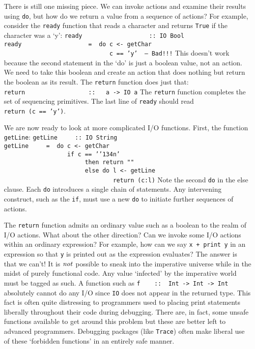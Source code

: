 There is still one missing piece.  We can invoke actions and examine
their results using \mbox{\tt do}, but how do we return a value from a sequence
of actions?  For example, consider the \mbox{\tt ready} function that reads a
character and returns \mbox{\tt True} if the character was a `y':
\bprog
\mbox{\tt ready\ \ \ \ \ \ \ \ \ \ \ \ \ \ \ \ \ \ \ ::\ IO\ Bool}\\
\mbox{\tt ready\ \ \ \ \ \ \ \ \ \ \ \ \ \ \ \ \ \ \ =\ \ do\ c\ <-\ getChar}\\
\mbox{\tt \ \ \ \ \ \ \ \ \ \ \ \ \ \ \ \ \ \ \ \ \ \ \ \ \ \ \ \ \ \ c\ ==\ 'y'\ \ --\ Bad!!!}
\eprog
This doesn't work because the second statement in the `do' is just a
boolean value, not an action.  We need to take this boolean and create
an action that does nothing but return the boolean as its result.
The \mbox{\tt return} function does just that:
\bprog
\mbox{\tt return\ \ \ \ \ \ \ \ \ \ \ \ \ \ \ \ \ \ ::\ \ \ a\ ->\ IO\ a}
\eprog
The \mbox{\tt return} function completes the set of sequencing primitives.  The
last line of \mbox{\tt ready} should read \mbox{\tt return\ (c\ ==\ 'y')}.

We are now ready to look at more complicated I/O functions.  First,
the function \mbox{\tt getLine}:
\bprog
\mbox{\tt getLine\ \ \ \ \ ::\ IO\ String}\\
\mbox{\tt getLine\ \ \ \ \ =\ \ do\ c\ <-\ getChar}\\
\mbox{\tt \ \ \ \ \ \ \ \ \ \ \ \ \ \ \ \ \ \ if\ c\ ==\ '{\char'134}n'}\\
\mbox{\tt \ \ \ \ \ \ \ \ \ \ \ \ \ \ \ \ \ \ \ \ \ \ \ then\ return\ ""}\\
\mbox{\tt \ \ \ \ \ \ \ \ \ \ \ \ \ \ \ \ \ \ \ \ \ \ \ else\ do\ l\ <-\ getLine}\\
\mbox{\tt \ \ \ \ \ \ \ \ \ \ \ \ \ \ \ \ \ \ \ \ \ \ \ \ \ \ \ \ \ \ \ return\ (c:l)}
\eprog
Note the second \mbox{\tt do} in the else clause.  Each \mbox{\tt do} introduces a single
chain of statements.   Any intervening
construct, such as the \mbox{\tt if}, must use a new \mbox{\tt do} to initiate further
sequences of actions.

The \mbox{\tt return} function admits an ordinary value such as a boolean to
the realm of I/O actions. 
What about the other direction?  Can we invoke some I/O actions within an
ordinary expression?  For example, how can we say \mbox{\tt x\ +\ print\ y} 
in an expression so that \mbox{\tt y} is printed out as the
expression evaluates?  The answer is that we can't!  It is \mbox{$\it not$} possible to
sneak into the imperative universe while in the midst of purely
functional code.  Any value `infected' by the imperative world must be
tagged as such.  A function such as 
\bprog
\mbox{\tt f\ \ \ \ ::\ \ Int\ ->\ Int\ ->\ Int}
\eprog
absolutely cannot do any I/O since \mbox{\tt IO} does not
appear in the returned type.
This fact is often quite distressing to
programmers used to placing print statements liberally throughout
their code during debugging.  There are, in fact, some unsafe
functions available to get around this problem but these are
better left to advanced programmers.  Debugging packages (like \mbox{\tt Trace})
often make liberal use of these `forbidden functions' in an entirely safe
manner.  

